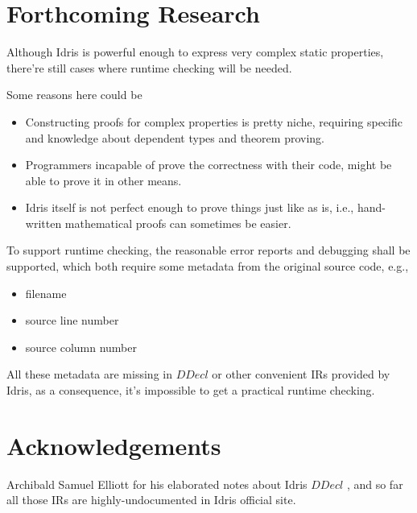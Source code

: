 \documentclass[a1,portrait]{a1poster}
\begin{document}
\begin{multicols}{2}
\color{Black}

\section*{Forthcoming Research}

Although Idris is powerful enough to express very complex static properties,
there're still cases where runtime checking will be needed.

Some reasons here could be

\begin{itemize}
    \setlength\itemsep{-0.2em}
    \item Constructing proofs for complex properties is pretty niche, requiring specific and knowledge about dependent types and theorem proving.
    \item Programmers incapable of prove the correctness with their code, might be able to prove it in other means.
    \item Idris itself is not perfect enough to prove things just like as is, i.e., hand-written mathematical proofs can sometimes be easier.
\end{itemize}

To support runtime checking, the reasonable error reports and debugging shall be supported,
which both require some metadata from the original source code, e.g.,

\begin{itemize}
    \setlength\itemsep{-0.2em}
    \item filename
    \item source line number
    \item source column number
\end{itemize}

All these metadata are missing in $DDecl$ or other convenient IRs provided by Idris,
as a consequence, it's impossible to get a practical runtime checking.


\section*{Acknowledgements}

Archibald Samuel Elliott for his elaborated notes about Idris $DDecl$ \cite {elliott2015concurrency}, and so far all those IRs are highly-undocumented in Idris official site.

\begin{small}%
\begin{multicols}{2}%
\nocite{*} %
\end{multicols}
\end{small}



\end{multicols}
\end{document}
